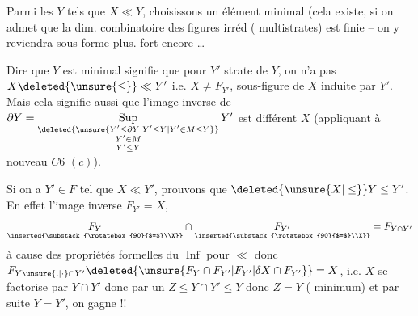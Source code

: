 
Parmi les $Y$ tels que $X\ll Y$, choisissons un élément minimal (cela existe, si on admet que la dim. combinatoire des figures irréd ( multistrates) est finie -- on y reviendra sous forme   plus. fort encore \ldots\ 

Dire que $Y$ est minimal signifie que pour $Y'$ strate de $Y$, on n'a pas $X\deleted{\unsure{\leq}}\ll Y'$ i.e. $X\neq F_{Y'}$, sous-figure de $X$ induite par $Y'$. Mais cela signifie aussi que l'image inverse de $\partial Y=\mathop{\mathrm{Sup}}\limits_{\substack{\deleted{\unsure{Y'\leq\partial Y|Y'\leq Y|Y'\in M\leq Y}}\\Y'\in M\\Y'\leq Y}}Y'$ est différent  $X$ (appliquant à nouveau $C6$ $(c)$). 

Si on a $Y'\in\bar F$ tel que $X\ll Y'$, prouvons que $\deleted{\unsure{X|\leq}}Y\leq Y'$.  En  effet l'image inverse $F_{Y'}=X$, 
\[
 \underset{\inserted{\substack{\rotatebox{90}{$=$}\\X}}}{F_Y}\cap
 \underset{\inserted{\substack{\rotatebox{90}{$=$}\\X}}}{F_{Y'}}=F_{Y\cap Y'}
\]
à cause des propriétés formelles du $\operatorname{Inf}$ pour $\ll$ donc $F_{Y\unsure{.|\cdot}\cap Y'}\deleted{\unsure{F_Y\cap F_{Y'}|F_{Y'}|\delta X\cap F_{Y'}}}=X$, i.e. $X$ se factorise par $Y\cap Y'$ donc par un $Z\leq Y\cap Y'\leq Y$ donc $Z=Y$ ( minimum) et par suite $Y=Y'$, on gagne !!
